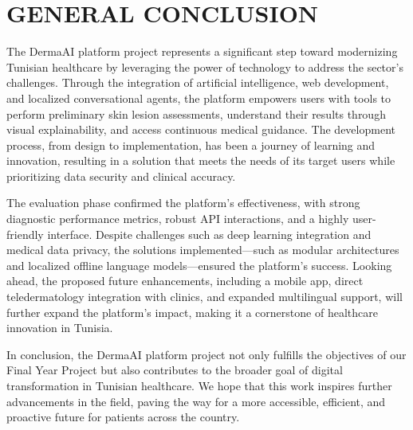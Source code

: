 \clearpage
\chapter*{GENERAL CONCLUSION}

The DermaAI platform project represents a significant step toward modernizing Tunisian healthcare by leveraging the power of technology to address the sector's challenges. Through the integration of artificial intelligence, web development, and localized conversational agents, the platform empowers users with tools to perform preliminary skin lesion assessments, understand their results through visual explainability, and access continuous medical guidance. The development process, from design to implementation, has been a journey of learning and innovation, resulting in a solution that meets the needs of its target users while prioritizing data security and clinical accuracy.

The evaluation phase confirmed the platform's effectiveness, with strong diagnostic performance metrics, robust API interactions, and a highly user-friendly interface. Despite challenges such as deep learning integration and medical data privacy, the solutions implemented---such as modular architectures and localized offline language models---ensured the platform's success. Looking ahead, the proposed future enhancements, including a mobile app, direct teledermatology integration with clinics, and expanded multilingual support, will further expand the platform's impact, making it a cornerstone of healthcare innovation in Tunisia.

In conclusion, the DermaAI platform project not only fulfills the objectives of our Final Year Project but also contributes to the broader goal of digital transformation in Tunisian healthcare. We hope that this work inspires further advancements in the field, paving the way for a more accessible, efficient, and proactive future for patients across the country.
\newpage
